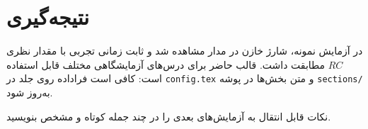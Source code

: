 \section{نتیجه‌گیری}

در آزمایش نمونه، شارژ خازن در مدار  مشاهده شد و ثابت زمانی تجربی با مقدار نظری $RC$ مطابقت داشت.
قالب حاضر برای درس‌های آزمایشگاهی مختلف قابل استفاده است: کافی است فراداده روی جلد در \texttt{config.tex} و متن بخش‌ها در پوشه \texttt{sections/} به‌روز شود.

نکات قابل انتقال به آزمایش‌های بعدی را در چند جمله کوتاه و مشخص بنویسید.
